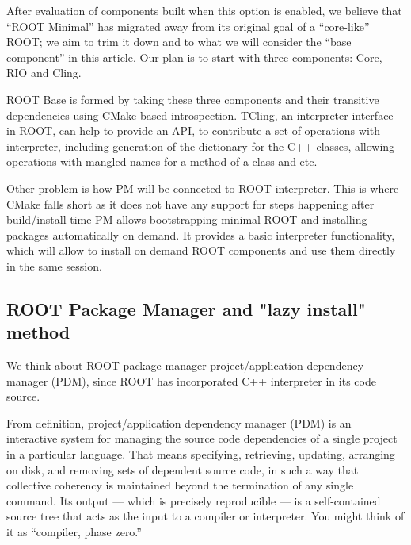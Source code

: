 \documentclass{webofc}
\begin{document}
After evaluation of components built when this option is enabled, we believe that “ROOT Minimal” has migrated away from its original goal of a “core-like” ROOT; we aim to trim it down and to what we will consider the “base component” in this article. Our plan is to start with three components: Core, RIO and Cling.

ROOT Base is formed by taking these three components and their transitive dependencies using CMake-based introspection. TCling, an interpreter interface in ROOT, can help to provide an API, to contribute a set of operations with interpreter, including generation of the dictionary for the C++ classes, allowing operations with mangled names for a method of a class and etc.

Other problem is how PM will be connected to ROOT interpreter. This is where CMake falls short as it does not have any support for steps happening after build/install time PM allows bootstrapping minimal ROOT and installing packages automatically on demand. It provides a basic interpreter functionality,  which will allow to install on demand ROOT components and use them directly in the same session.

\subsection{ROOT Package Manager and "lazy install" method}

We think about ROOT package manager project/application dependency manager (PDM), since ROOT has incorporated C++ interpreter in its code source.

From definition, project/application dependency manager (PDM) is an interactive system for managing the source code dependencies of a single project in a particular language. That means specifying, retrieving, updating, arranging on disk, and removing sets of dependent source code, in such a way that collective coherency is maintained beyond the termination of any single command. 
Its output — which is precisely reproducible — is a self-contained source tree that acts as the input to a compiler or interpreter. You might think of it as “compiler, phase zero.” \cite{pdm}
\end{document}
